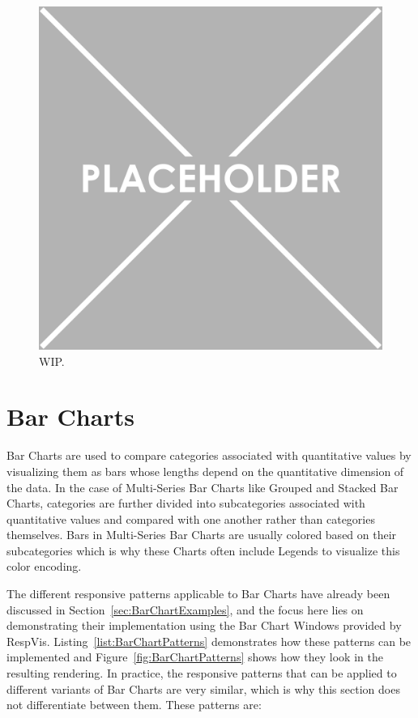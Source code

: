 \begin{figure}[tp]
\centering
\includegraphics[keepaspectratio,width=\linewidth,height=\fullh]{images/placeholder.png}
\caption[Results of Legend-Related Responsive Patterns]{
  WIP.
}
\label{fig:LegendPatterns}
\end{figure}

\section{Bar Charts}
\label{sec:BarChartsUsage}

Bar Charts are used to compare categories associated with quantitative values by visualizing them as bars whose lengths depend on the quantitative dimension of the data.
In the case of Multi-Series Bar Charts like Grouped and Stacked Bar Charts, categories are further divided into subcategories associated with quantitative values and compared with one another rather than categories themselves.
Bars in Multi-Series Bar Charts are usually colored based on their subcategories which is why these Charts often include Legends to visualize this color encoding.

The different responsive patterns applicable to Bar Charts have already been discussed in Section~\ref{sec:BarChartExamples}, and the focus here lies on demonstrating their implementation using the Bar Chart Windows provided by RespVis.
Listing~\ref{list:BarChartPatterns} demonstrates how these patterns can be implemented and Figure~\ref{fig:BarChartPatterns} shows how they look in the resulting rendering.
In practice, the responsive patterns that can be applied to different variants of Bar Charts are very similar, which is why this section does not differentiate between them.
These patterns are:

